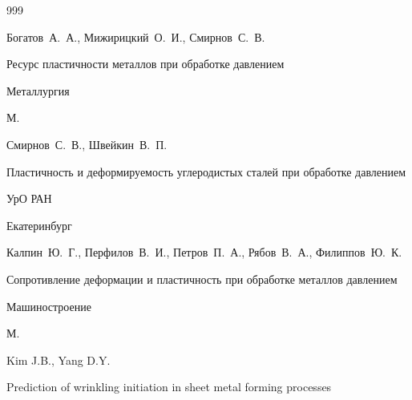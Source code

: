\begin{thebibliography}{999}

\by Богатов~А.~А., Мижирицкий~О.~И., Смирнов~С.~В.  

\book Ресурс пластичности металлов при обработке давлением


\publ Металлургия

\publaddr М.





\by Смирнов~С.~В., Швейкин~В.~П.  

\book Пластичность и деформируемость углеродистых сталей при обработке давлением


\publ УрО РАН

\publaddr Екатеринбург





\by Калпин~Ю.~Г., Перфилов~В.~И., Петров~П.~А., Рябов~В.~А., Филиппов~Ю.~К.  

\book Сопротивление деформации и пластичность при обработке металлов давлением


\publ Машиностроение

\publaddr М.















\by Kim J.B., Yang D.Y. 

\paper Prediction of wrinkling initiation in sheet metal forming processes 


\end{thebibliography}

